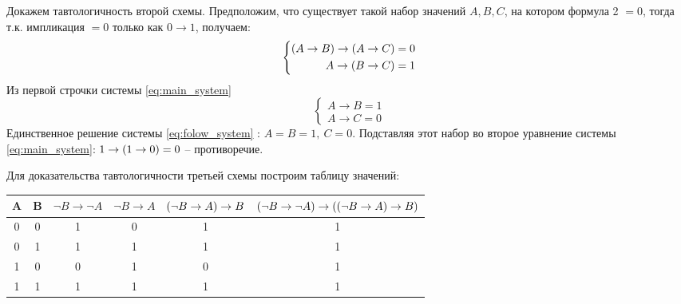 Докажем тавтологичность второй схемы. Предположим, что существует такой набор значений $A, B, C$, на котором  формула 2 $=0$, тогда т.к. импликация $= 0$ только как $0 \to 1$, получаем:
\begin{equation} \label{eq:main_system}
\left\{ \begin{aligned} 
\left( A \to B \right) \to \left( A \to C \right) = 0 \\
A \to \left( B \to C \right) = 1 
\end{aligned} \right.
\end{equation} 
Из первой строчки системы \eqref{eq:main_system}
\begin{equation} \label{eq:folow_system}
\left\{ \begin{aligned} 
A \to B = 1 \\
A \to C = 0
\end{aligned} \right.
\end{equation}
Единственное решение системы \eqref{eq:folow_system} : $A = B = 1, ~ C = 0$. Подставляя этот набор во второе уравнение системы \eqref{eq:main_system}: $1 \to \left( 1 \to 0 \right) = 0$ -- противоречие.

Для доказательства тавтологичности третьей схемы построим таблицу значений:
\begin{table}[!h]
\begin{tabular}{|c|c|c|c|c|c|}
\hline 
A & B & $\neg B \to \neg A$ & $\neg B \to A$ & $\left( \neg B \to A \right) \to B$ & $\left( \neg B \to \neg A \right) \to \left( \left( \neg B \to A \right) \to B \right)$ \\ 
\hline 
0 & 0 & 1 & 0 & 1 & 1 \\ 
\hline 
0 & 1 & 1 & 1 & 1 & 1 \\ 
\hline 
1 & 0 & 0 & 1 & 0 & 1 \\ 
\hline 
1 & 1 & 1 & 1 & 1 & 1 \\ 
\hline 
\end{tabular} 
\end{table}

